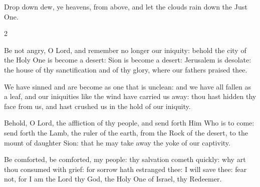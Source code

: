 \begin{enpars}\noindent Drop down dew, ye heavens, from above, and let the clouds rain down the Just One.\end{enpars}

\begin{multicols}{2}
\raggedcolumns
\begin{enpars}
 Be not angry, O Lord, and remember no longer our iniquity:
     behold the city of the Holy One is become a desert: Sion is
     become a desert: Jerusalem is desolate: the house of thy
     sanctification and of thy glory, where our fathers praised thee.
     
     We have sinned and are become as one that is unclean: and we
     have all fallen as a leaf, and our iniquities like the wind have
     carried us away: thou hast hidden thy face from us, and hast
     crushed us in the hold of our iniquity.
     
      Behold, O Lord, the affliction of thy people, and send forth Him
     Who is to come: send forth the Lamb, the ruler of the earth, from
     the Rock of the desert, to the mount of daughter Sion: that he
     may take away the yoke of our captivity.
     
     Be comforted, be comforted, my people: thy salvation cometh
     quickly: why art thou consumed with grief: for sorrow hath
     estranged thee: I will save thee: fear not, for I am the Lord thy
     God, the Holy One of Israel, thy Redeemer.\end{enpars}
     \end{multicols}